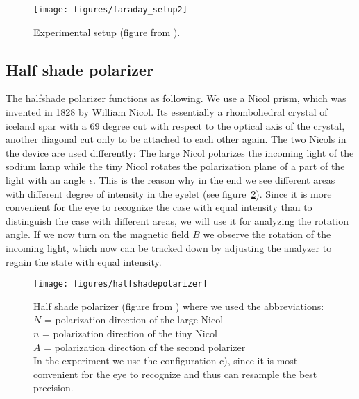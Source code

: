 \begin{figure}
    \begin{centering}
        \texttt{[image: figures/faraday\_setup2]}
        \caption{Experimental setup (figure from \cite{staatsexamen}).}
        \label{fig:faraday_setup}
    \end{centering}
\end{figure}

\subsection{Half shade polarizer}
The halfshade polarizer functions as following. We use a Nicol prism, which was invented in
1828 by William Nicol. Its essentially a rhombohedral crystal of iceland spar with a 69 degree cut with
respect to the optical axis of the crystal, another diagonal cut only to be attached to each
other again. The two Nicols in the device are used differently: The large Nicol polarizes the
incoming light of the sodium lamp while the tiny Nicol rotates the polarization plane of 
a part of the light with an angle $\epsilon$. This is the reason why in the end we see different
areas with different degree of intensity in the eyelet (see figure~\ref{fig:halfshadepolarizer}).
Since it is more convenient for the eye to recognize the case with equal intensity than to
distinguish the case with different areas, we will use it for analyzing the rotation angle.
If we now turn on the magnetic field $B$ we observe the rotation of the incoming light, which
now can be tracked down by adjusting the analyzer to regain the state with equal intensity.
\begin{figure}
    \begin{centering}
        \texttt{[image: figures/halfshadepolarizer]}
        \caption{Half shade polarizer (figure from \cite{staatsexamen}) where we used the
            abbreviations: \\
            $N$ = polarization direction of the large Nicol\\
            $n$ = polarization direction of the tiny Nicol\\
            $A$ = polarization direction of the second polarizer\\
            In the experiment we use the configuration c), since it is most convenient
            for the eye to recognize and thus can resample the best precision.
            }
        \label{fig:halfshadepolarizer}
    \end{centering}
\end{figure}
